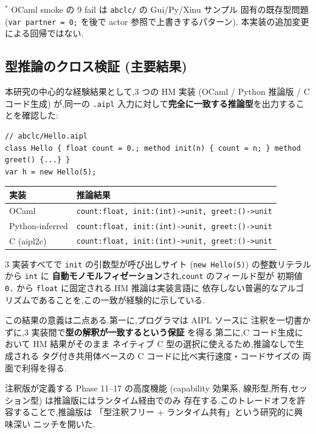 \documentclass[11pt,a4paper]{article}
\newcommand{\code}[1]{\texttt{\small #1}}
\begin{document}
\noindent
$^*$ OCaml smoke の 9 fail は \code{abclc/} の Gui/Py/Xinu サンプル
固有の既存型問題 (\code{var partner = 0;} を後で actor 参照で上書きするパターン).
本実装の追加変更による回帰ではない.

\subsection{型推論のクロス検証 (主要結果)}
\label{sec:cross}

本研究の中心的な経験結果として,3 つの HM 実装
(OCaml / Python 推論版 / C コード生成) が,同一の \code{.aipl}
入力に対して\textbf{完全に一致する推論型}を出力することを確認した:

\begin{lstlisting}
// abclc/Hello.aipl
class Hello { float count = 0.; method init(n) { count = n; } method greet() {...} }
var h = new Hello(5);
\end{lstlisting}

\begin{tabularx}{\linewidth}{l X}
  \toprule
  実装 & 推論結果 \\
  \midrule
  OCaml           & \code{count:float, init:(int)->unit, greet:()->unit} \\
  Python-inferred & \code{count:float, init:(int)->unit, greet:()->unit} \\
  C (aipl2c)      & \code{count:float, init:(int)->unit, greet:()->unit} \\
  \bottomrule
\end{tabularx}

3 実装すべてで \code{init} の引数型が呼び出しサイト
(\code{new Hello(5)}) の整数リテラルから \code{int} に
\textbf{自動モノモルフィゼーション}され,\code{count} のフィールド型が
初期値 \code{0.} から \code{float} に固定される.HM 推論は実装言語に
依存しない普遍的なアルゴリズムであることを,この一致が経験的に示している.

この結果の意義は二点ある.第一に,プログラマは AIPL ソースに
注釈を一切書かずに,3 実装間で\textbf{型の解釈が一致するという保証}
を得る.第二に,C コード生成において HM 結果がそのまま
ネイティブ C 型の選択に使えるため,推論なしで生成される
タグ付き共用体ベースの C コードに比べ実行速度・コードサイズの
両面で利得を得る.

注釈版が定義する Phase 11--17 の高度機能 (capability 効果系,
線形型,所有,セッション型) は推論版にはランタイム経由でのみ
存在する.このトレードオフを許容することで,推論版は
「型注釈フリー + ランタイム共有」という研究的に興味深い
ニッチを開いた.
\end{document}
